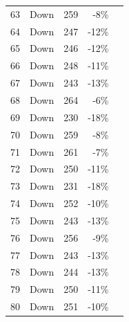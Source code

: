 \documentclass{scrartcl}
\begin{document}
\begin{longtable}{|r|l|r|r|r|}
    63    & Down  & 259   & \cellcolor[rgb]{ 1,  .922,  .612}\textcolor[rgb]{ .612,  .341,  0}{-8\%} &  \\
    64    & Down  & 247   & \cellcolor[rgb]{ 1,  .78,  .808}\textcolor[rgb]{ .612,  0,  .024}{-12\%} &  \\
    65    & Down  & 246   & \cellcolor[rgb]{ 1,  .78,  .808}\textcolor[rgb]{ .612,  0,  .024}{-12\%} &  \\
    66    & Down  & 248   & \cellcolor[rgb]{ 1,  .78,  .808}\textcolor[rgb]{ .612,  0,  .024}{-11\%} &  \\
    67    & Down  & 243   & \cellcolor[rgb]{ 1,  .78,  .808}\textcolor[rgb]{ .612,  0,  .024}{-13\%} &  \\
    68    & Down  & 264   & \cellcolor[rgb]{ 1,  .922,  .612}\textcolor[rgb]{ .612,  .341,  0}{-6\%} &  \\
    69    & Down  & 230   & \cellcolor[rgb]{ 1,  .78,  .808}\textcolor[rgb]{ .612,  0,  .024}{-18\%} &  \\
    70    & Down  & 259   & \cellcolor[rgb]{ 1,  .922,  .612}\textcolor[rgb]{ .612,  .341,  0}{-8\%} &  \\
    71    & Down  & 261   & \cellcolor[rgb]{ 1,  .922,  .612}\textcolor[rgb]{ .612,  .341,  0}{-7\%} &  \\
    72    & Down  & 250   & \cellcolor[rgb]{ 1,  .78,  .808}\textcolor[rgb]{ .612,  0,  .024}{-11\%} &  \\
    73    & Down  & 231   & \cellcolor[rgb]{ 1,  .78,  .808}\textcolor[rgb]{ .612,  0,  .024}{-18\%} &  \\
    74    & Down  & 252   & \cellcolor[rgb]{ 1,  .922,  .612}\textcolor[rgb]{ .612,  .341,  0}{-10\%} &  \\
    75    & Down  & 243   & \cellcolor[rgb]{ 1,  .78,  .808}\textcolor[rgb]{ .612,  0,  .024}{-13\%} &  \\
    76    & Down  & 256   & \cellcolor[rgb]{ 1,  .922,  .612}\textcolor[rgb]{ .612,  .341,  0}{-9\%} &  \\
    77    & Down  & 243   & \cellcolor[rgb]{ 1,  .78,  .808}\textcolor[rgb]{ .612,  0,  .024}{-13\%} &  \\
    78    & Down  & 244   & \cellcolor[rgb]{ 1,  .78,  .808}\textcolor[rgb]{ .612,  0,  .024}{-13\%} &  \\
    79    & Down  & 250   & \cellcolor[rgb]{ 1,  .78,  .808}\textcolor[rgb]{ .612,  0,  .024}{-11\%} &  \\
    80    & Down  & 251   & \cellcolor[rgb]{ 1,  .922,  .612}\textcolor[rgb]{ .612,  .341,  0}{-10\%} &  \\

\end{longtable}
\end{document}
